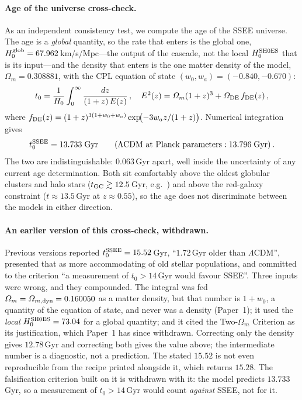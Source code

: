 \documentclass[12pt,a4paper]{article}
\renewcommand{\Omega}{\varOmega}
\begin{document}
\paragraph{Age of the universe cross-check.}
As an independent consistency test, we compute the age of the SSEE universe.
The age is a \emph{global} quantity, so the rate that enters is the global one,
$H_0^{\rm glob}=67.962$\,km/s/Mpc---the output of the cascade, not the local
$H_0^{\rm SH0ES}$ that is its input---and the density that enters is the one
matter density of the model, $\Omega_m = 0.308881$, with the CPL equation of
state \citep{Chevallier2001,Linder2003} $(w_0, w_a) = (-0.840, -0.670)$:
\begin{equation}
  t_0 = \frac{1}{H_0}\int_0^\infty \frac{dz}{(1+z)\,E(z)}\,,
  \quad
  E^2(z) = \Omega_m(1+z)^3 + \Omega_{\rm DE}\,f_{\rm DE}(z)\,,
\end{equation}
where $f_{\rm DE}(z) = (1+z)^{3(1+w_0+w_a)}\exp\!\bigl(-3w_a z/(1+z)\bigr)$.
Numerical integration gives
\begin{equation}
  t_0^{\rm SSEE} = 13.733\;\text{Gyr}
  \qquad (\Lambda\text{CDM at Planck parameters}: 13.796\;\text{Gyr})\,.
\end{equation}
The two are indistinguishable: $0.063$\,Gyr apart, well inside the uncertainty
of any current age determination. Both sit comfortably above the oldest
globular clusters and halo stars ($t_{\rm GC} \gtrsim 12.5$\,Gyr,
e.g.\ \citealt{Valcin2021,Bond2013}) and above the \citet{Cimatti2023}
red-galaxy constraint ($t \approx 13.5$\,Gyr at $z \approx 0.55$), so the age
does not discriminate between the models in either direction.

\paragraph{An earlier version of this cross-check, withdrawn.}
Previous versions reported $t_0^{\rm SSEE} = 15.52$\,Gyr, ``$1.72$\,Gyr older
than $\Lambda$CDM'', presented that as more accommodating of old stellar
populations, and committed to the criterion ``a measurement of
$t_0 > 14$\,Gyr would favour SSEE''. Three inputs were wrong, and they
compounded. The integral was fed $\Omega_m = \Omega_{m,\rm dyn} = 0.160050$ as
a matter density, but that number is $1+w_0$, a quantity of the equation of
state, and never was a density (Paper~1); it used the \emph{local}
$H_0^{\rm SH0ES}=73.04$ for a global quantity; and it cited the Two-$\Omega_m$
Criterion as its justification, which Paper~1 has since withdrawn. Correcting
only the density gives $12.78$\,Gyr and correcting both gives the value above;
the intermediate number is a diagnostic, not a prediction. The stated $15.52$
is not even reproducible from the recipe printed alongside it, which returns
$15.28$. The falsification criterion built on it is withdrawn with it: the
model predicts $13.733$\,Gyr, so a measurement of $t_0>14$\,Gyr would count
\emph{against} SSEE, not for it.
\end{document}
